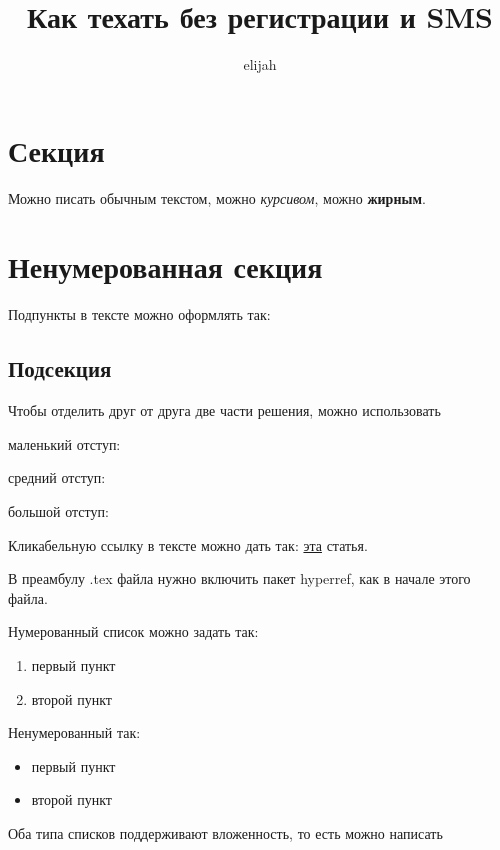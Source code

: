 \documentclass{article}
\title{Как техать без регистрации и SMS}
\author{elijah}
\date{}
\begin{document}
\maketitle

\section*{Секция}

Можно писать обычным текстом, можно \textit{курсивом}, можно \textbf{жирным}.



\section*{Ненумерованная секция}

Подпункты в тексте можно оформлять так:

\subsection{Подсекция}

Чтобы отделить друг от друга две части решения, можно использовать

маленький отступ:

\smallskip

средний отступ:

\medskip

большой отступ:

\bigskip

Кликабельную ссылку в тексте можно дать так:
\href{https://arxiv.org/pdf/1406.7444.pdf}{эта} статья.

В преамбулу .tex файла нужно включить пакет hyperref, как в начале этого файла.

Нумерованный список можно задать так:

\begin{enumerate}
    \item первый пункт
    \item второй пункт
\end{enumerate}

Ненумерованный так:

\begin{itemize}
    \item первый пункт
    \item второй пункт
\end{itemize}

Оба типа списков поддерживают вложенность, то есть можно написать
\end{document}
